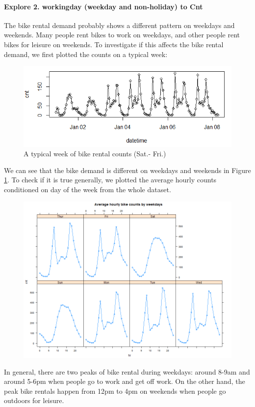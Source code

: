 \documentclass[12pt]{article}
\begin{document}
	\paragraph*{Explore 2. workingday (weekday and non-holiday) to Cnt} The bike rental demand probably shows a different pattern on weekdays and weekends. Many people rent bikes to work on weekdays, and other people rent bikes for leisure on weekends. To investigate if this affects the bike rental demand, we first plotted the counts on a typical week:
	\begin{figure}[H]
		\centering
		\includegraphics[scale=.9]{figures/week_cnt.png}
		\caption{A typical week of bike rental counts (Sat.- Fri.)}
		\label{fig:typical_week}
	\end{figure}
 We can see that the bike demand is different on weekdays and weekends in Figure \ref{fig:typical_week}. To check if it is true generally, we plotted the average hourly counts conditioned on day of the week from the whole dataset.
	\begin{figure}[H]
		\centering
		\includegraphics[scale=.5]{figures/hr_weekday.png}
	\end{figure}
	In general, there are two peaks of bike rental during weekdays: around 8-9am and around 5-6pm when people go to work and get off work. On the other hand, the peak bike rentals happen from 12pm to 4pm on weekends when people go outdoors for leisure. 
	
\end{document}
